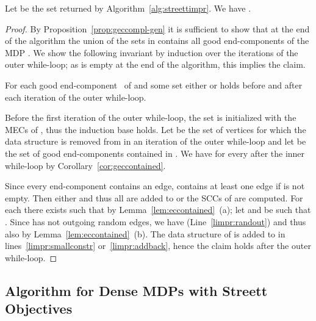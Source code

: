 \documentclass[11pt,letterpaper]{article}
\newcommand{\lu}{\textup{(}}
\newcommand{\ru}{\textup{)}\xspace}
\newcommand{\upbr}[1]{\lu #1\ru}
\begin{document}
\begin{proposition}\label{prop:streettimprcompl}
		Let  be the set returned by Algorithm~\ref{alg:streettimpr}.
	We have .
\end{proposition}

\begin{proof}
	By Proposition~\ref{prop:geccompl-gen} it is sufficient to show that at the end of 
	the algorithm the union of the sets in  contains
	all good end-components of the MDP . We show the following invariant 
	by induction over the iterations of the outer while-loop;
	as  is empty at the end of the algorithm, this implies the claim.
	\begin{invariant}\label{inv:geccontained}
		For each good end-component~ of  and some set 
		either  or  holds before and after each iteration 
		of the outer while-loop.
	\end{invariant}

	Before the first iteration of the outer while-loop, the 
	set  is initialized with the MECs of , thus the induction base holds.
	Let  be the set of vertices for which the data structure is 
	removed from  in an iteration of the outer while-loop and 
	let  be the set of good end-components 
	contained in . We have  for every 
	 after the inner while-loop by Corollary~\ref{cor:geccontained}.
	
	Since every end-component contains an edge,  contains at least one
	edge if  is not empty. Then either  and thus all  are added to  or the SCCs  of  
	are computed. For each  there exists  such that  by Lemma~\ref{lem:eccontained}~\upbr{a}; 
	let  and  be such that . Since  has not 
	outgoing random edges, we have  (Line~\ref{limpr:randout})
	and thus also  by Lemma~\ref{lem:eccontained}~\upbr{b}. The data structure of 
	is added to  in lines~\ref{limpr:smallconstr} or~\ref{limpr:addback},
	hence the claim holds after the outer while-loop.
\end{proof}

\subsection{Algorithm for Dense MDPs with Streett Objectives}\label{sec:streettdense}
\end{document}
